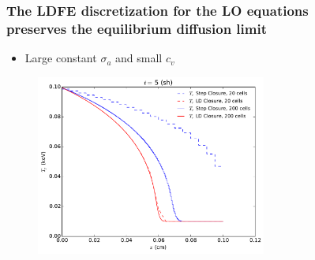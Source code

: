 \documentclass[xcolor=dvipsnames,hyperref={pdfpagelabels=false},unknownkeysallowed,
handout]{beamer}
\newcommand{\colG}[1]{{\color{Gray!110} #1}}
\newlength{\wideitemsep}
\let\olditem\item
\renewcommand{\item}{\setlength{\itemsep}{\wideitemsep}\olditem}
\begin{document}
\begin{frame}
    \frametitle{The LDFE discretization for the LO equations \\ preserves the equilibrium diffusion limit}
        \begin{itemize}
            \item[] \colG{Large constant $\sigma_a$ and small $c_v$}
        \end{itemize}
\begin{figure}
    \centering
    \includegraphics[width=0.6755799\textwidth]{diff_limit_compare.pdf}
\end{figure}
\end{frame}
\end{document}
